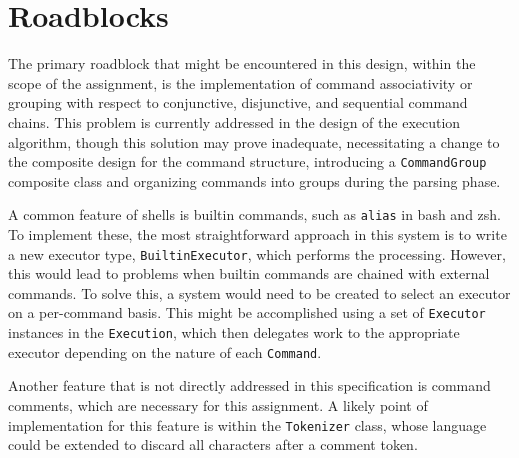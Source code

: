 \documentclass{article}
\begin{document}
  \section{Roadblocks}

  The primary roadblock that might be encountered in this design, within
  the scope of the assignment, is the implementation of command
  associativity or grouping with respect to conjunctive, disjunctive,
  and sequential command chains.  This problem is currently addressed in
  the design of the execution algorithm, though this solution may prove
  inadequate, necessitating a change to the composite design for the
  command structure, introducing a \texttt{CommandGroup} composite class
  and organizing commands into groups during the parsing phase.

  A common feature of shells is builtin commands, such as \texttt{alias}
  in bash and zsh.  To implement these, the most straightforward
  approach in this system is to write a new executor type,
  \texttt{BuiltinExecutor}, which performs the processing.  However,
  this would lead to problems when builtin commands are chained with
  external commands.  To solve this, a system would need to be created
  to select an executor on a per-command basis.  This might be
  accomplished using a set of \texttt{Executor} instances in the
  \texttt{Execution}, which then delegates work to the appropriate
  executor depending on the nature of each \texttt{Command}.

  Another feature that is not directly addressed in this specification
  is command comments, which are necessary for this assignment.  A
  likely point of implementation for this feature is within the
  \texttt{Tokenizer} class, whose language could be extended to discard
  all characters after a comment token.
\end{document}
